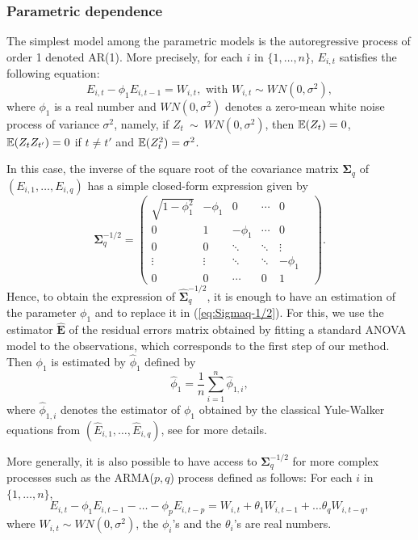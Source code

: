 \subsubsection{Parametric dependence}\label{subsec:param}
The simplest model among the parametric models is the autoregressive process
of order 1 denoted AR(1). More precisely, for each $i$ in
$\{1,\dots,n\}$, $E_{i,t}$ satisfies the following equation:
\begin{equation}\label{eq:AR1}
E_{i,t}-\phi_1 E_{i,t-1}=W_{i,t},\textrm{ with } W_{i,t}\sim WN(0,\sigma^2),
\end{equation}
where $\phi_1$ is a real number and $WN(0,\sigma^2)$ denotes a zero-mean white noise process of variance $\sigma^2$, namely, if $Z_{t}~\sim~WN(0,\sigma^2)$, then
$\mathbb{E}(Z_t)=0$, $\mathbb{E}(Z_t Z_{t'})=0$ if $t\neq t'$ and $\mathbb{E}(Z_t^2)=\sigma^2$.

In this case, the inverse of the square root of the covariance matrix
$\boldsymbol{\Sigma}_q$ of $(E_{i,1},\dots,E_{i,q})$ has a simple closed-form 
expression given by
\begin{equation}\label{eq:Sigmaq-1/2}
\boldsymbol{\Sigma}_q^{-1/2} =\left(
\begin{matrix}
\sqrt{1-\phi_1^2} & -\phi_1 & 0 & \cdots & 0\\
0 & 1 & -\phi_1 & \cdots & 0 \\
0 & 0 & \ddots & \ddots & \vdots \\
\vdots & \vdots &  \ddots & \ddots & -\phi_1 \\
0 & 0 & \cdots  & 0 & 1 &
\end{matrix}
\right).
\end{equation}
Hence, to obtain the expression of $\widehat{\boldsymbol{\Sigma}}_q^{-1/2}$, it is enough to have an estimation of the parameter $\phi_1$
and to replace it in (\ref{eq:Sigmaq-1/2}). For this, we use the
estimator $\widehat{\boldsymbol{E}}$ of the residual errors matrix
obtained by fitting a standard ANOVA model to the observations, which
corresponds to the first step of our method. Then
$\phi_1$ is estimated by $\widehat{\phi}_1$  defined by
$$
\widehat{\phi}_1=\frac1n\sum_{i=1}^n \widehat{\phi}_{1,i},
$$
where $\widehat{\phi}_{1,i}$ denotes the estimator of $\phi_1$ obtained by the classical Yule-Walker equations from 
$(\widehat{E}_{i,1},\dots,\widehat{E}_{i,q})$, see \cite{brockwell:davis} for more
details. 

More generally, it is also possible to have access to
$\boldsymbol{\Sigma}_q^{-1/2}$ for more complex processes such as the ARMA($p,q$) process defined
as follows: For each $i$ in $\{1,\dots,n\}$,
\begin{equation}\label{eq:ARMA}
E_{i,t}-\phi_1 E_{i,t-1}-\dots-\phi_p E_{i,t-p} =W_{i,t}+\theta_1
W_{i,t-1}+\dots\theta_q W_{i,t-q},
\end{equation}
where $W_{i,t}\sim WN(0,\sigma^2)$, the $\phi_i$'s and the $\theta_i$'s are real numbers.


